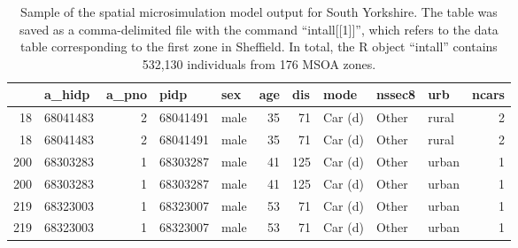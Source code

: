 \begin{table}[htbp]
\caption[Sample of the spatial microsimulation model output]
{Sample of the spatial microsimulation model output for South
Yorkshire. The table was saved as a comma-delimited file with the command
``intall[[1]]'', which refers to the data table corresponding to the
first zone in Sheffield. In total, the R object
``intall'' contains 532,130 individuals from 176 MSOA zones.}
\begin{tabular}{rrrrlrrlllr}
\toprule
\multicolumn{1}{l}{} & \multicolumn{1}{l}{a\_hidp} & \multicolumn{1}{l}{a\_pno} &
\multicolumn{1}{l}{pidp} & sex & \multicolumn{1}{l}{age} & \multicolumn{1}{l}{dis}
& mode & nssec8 & urb & \multicolumn{1}{l}{ncars} \\
\midrule
18 & 68041483 & 2 & 68041491 & male & 35 & 71 & Car (d) & Other & rural & 2 \\
18 & 68041483 & 2 & 68041491 & male & 35 & 71 & Car (d) & Other & rural & 2 \\
200 & 68303283 & 1 & 68303287 & male & 41 & 125 & Car (d) & Other & urban & 1 \\
200 & 68303283 & 1 & 68303287 & male & 41 & 125 & Car (d) & Other & urban & 1 \\
219 & 68323003 & 1 & 68323007 & male & 53 & 71 & Car (d) & Other & urban & 1 \\
219 & 68323003 & 1 & 68323007 & male & 53 & 71 & Car (d) & Other & urban & 1 \\
\bottomrule
\end{tabular}
\label{tintallh}
\end{table}

